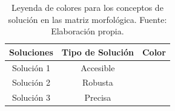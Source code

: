 \begin{table}[H]
	\centering
	\caption[Leyenda de colores para los conceptos de solución en las matriz morfológica.]{Leyenda de colores para los conceptos de solución en las matriz morfológica. Fuente: Elaboración propia.}
	\begin{tabular}{|c|c|c|}
		\hline
		\textbf{Soluciones} & \textbf{Tipo de Solución} & \textbf{Color} \bigstrut\\
		\hline
		Solución 1 & Accesible & \cellcolor[rgb]{ 1,  0,  0} \bigstrut\\
		\hline
		Solución 2 & Robusta & \cellcolor[rgb]{ 0,  0,  1} \bigstrut\\
		\hline
		Solución 3 & Precisa & \cellcolor[rgb]{ .298,  .835,  .078} \bigstrut\\
		\hline
	\end{tabular}%
	\label{tab:leyenda_colores_soluciones}%
\end{table}



